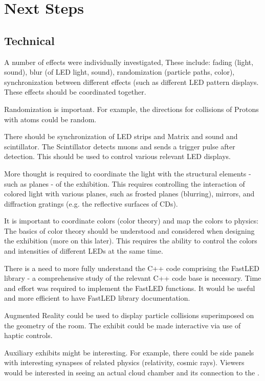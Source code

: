 \documentclass{article}
\begin{document}
\section{Next Steps}
\subsection{Technical}
A number of effects were individually investigated, These include: fading (light, sound), blur (of LED light, sound), randomization (particle paths, color), synchronization between different effects (such as different LED pattern displays. These effects should be coordinated together.

Randomization is important. For example, the directions for collisions of Protons with atoms could be random. 

There should be synchronization of LED strips and Matrix and sound and scintillator. The Scintillator detects muons and sends a trigger pulse after detection. This should be used to control various relevant LED displays.

More thought is required to coordinate the light with the structural elements - such as planes - of the exhibition. This requires controlling the interaction of colored light with various planes, such as frosted planes (blurring), mirrors, and diffraction gratings (e.g. the reflective surfaces of CDs).

It is important to coordinate colors (color theory) and map the colors to physics: The basics of color theory should be understood and considered when designing the exhibition (more on this later). This requires the ability to control the colors and intensities of different LEDs at the same time. 

There is a need to more fully understand the C++ code comprising the FastLED library - a comprehensive study of the relevant C++ code base is necessary. Time and effort was required to implement the FastLED functions. It would be useful and more efficient to have FastLED library documentation.

Augmented Reality could be used to display particle collisions superimposed on the geometry of the room. The exhibit could be made interactive via use of haptic controls.

Auxiliary exhibits might be interesting. For example, there could be side panels with interesting synapses of related physics (relativity, cosmic rays). Viewers would be interested in seeing an actual cloud chamber and its connection to the .
\end{document}
